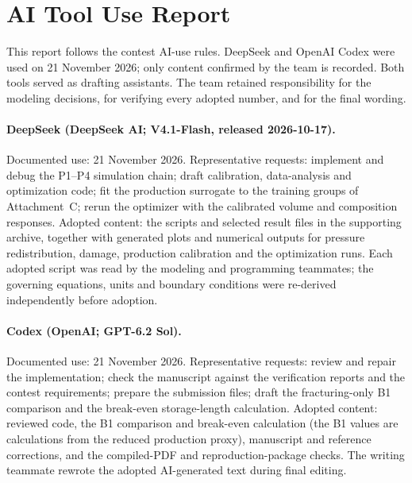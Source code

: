 \section*{AI Tool Use Report}
{}

This report follows the contest AI-use rules. DeepSeek and OpenAI Codex were
used on 21 November 2026; only content confirmed by the team is recorded. Both
tools served as drafting assistants. The team retained responsibility for the
modeling decisions, for verifying every adopted number, and for the final
wording.

\paragraph{DeepSeek (DeepSeek AI; V4.1-Flash, released 2026-10-17).}
Documented use: 21 November 2026. Representative requests: implement and debug
the P1--P4 simulation chain; draft calibration, data-analysis and optimization
code; fit the production surrogate to the training groups of Attachment~C;
rerun the optimizer with the calibrated volume and composition responses.
Adopted content: the scripts and selected result files in the supporting
archive, together with generated plots and numerical outputs for pressure
redistribution, damage, production calibration and the optimization runs. Each
adopted script was read by the modeling and programming teammates; the
governing equations, units and boundary conditions were re-derived
independently before adoption.

\paragraph{Codex (OpenAI; GPT-6.2 Sol).}
Documented use: 21 November 2026. Representative requests: review and repair
the implementation; check the manuscript against the verification reports and
the contest requirements; prepare the submission files; draft the
fracturing-only B1 comparison and the break-even storage-length calculation.
Adopted content: reviewed code, the B1 comparison and break-even calculation
(the B1 values are calculations from the reduced production proxy), manuscript
and reference corrections, and the compiled-PDF and reproduction-package
checks. The writing teammate rewrote the adopted AI-generated text during final
editing.

